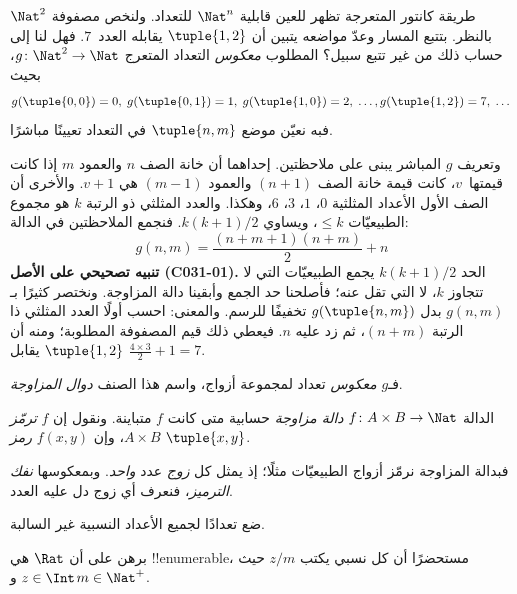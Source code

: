 \documentclass[../../../include/open-logic-section]{subfiles}
\begin{document}

\begin{explain}
طريقة كانتور المتعرجة تظهر للعين قابلية $\Nat^n$ للتعداد.
ولنخص مصفوفة $\Nat^2$ بالنظر. بتتبع المسار وعدّ مواضعه يتبين
أن $\tuple{1,2}$ يقابله العدد~$7$. فهل لنا إلى حساب ذلك من
غير تتبع سبيل؟ المطلوب \emph{معكوس} التعداد المتعرج
$g\colon \Nat^2 \to \Nat$، بحيث
\[
g(\tuple{0,0}) = 0, \;
g(\tuple{0,1}) = 1, \;
g(\tuple{1,0}) = 2, \; \dots,
g(\tuple{1,2}) = 7, \; \dots
\]
فبه نعيّن موضع $\tuple{n, m}$ في التعداد تعيينًا مباشرًا.

وتعريف $g$ المباشر يبنى على ملاحظتين. إحداهما أن خانة الصف $n$
والعمود $m$ إذا كانت قيمتها~$v$، كانت قيمة خانة الصف $(n+1)$
والعمود $(m-1)$ هي $v + 1$. والأخرى أن الصف الأول الأعداد
المثلثية $0$، $1$، $3$، $6$، وهكذا. والعدد المثلثي ذو الرتبة $k$
هو مجموع الطبيعيّات $\leq k$، ويساوي
$k(k+1)/2$. فنجمع الملاحظتين في الدالة:
\[
  g(n,m) = \frac{(n+m+1)(n+m)}{2} + n
\]
\textbf{تنبيه تصحيحي على الأصل (C031-01).} الحد $k(k+1)/2$ يجمع الطبيعيّات التي
لا تتجاوز $k$، لا التي تقل عنه؛ فأصلحنا حد الجمع وأبقينا دالة المزاوجة.
ونختصر كثيرًا بـ$g(n, m)$ بدل $g(\tuple{n, m})$ تخفيفًا للرسم.
والمعنى: احسب أولًا العدد المثلثي ذا الرتبة $(n+m)$،
ثم زد عليه $n$. فيعطي ذلك قيم المصفوفة المطلوبة؛ ومنه أن
$\tuple{1, 2}$ يقابل $\frac{4 \times 3}{2} +
1 = 7$.

فـ$g$ \emph{معكوس} تعداد لمجموعة أزواج، واسم هذا الصنف
\emph{دوال المزاوجة}.
\end{explain}

\begin{defn}
الدالة $f\colon A \times B \to \Nat$ \emph{دالة مزاوجة} حسابية
متى كانت $f$ متباينة. ونقول إن $f$ \emph{ترمّز} $A \times B$،
وإن $f(x,y)$ \emph{رمز} $\tuple{x,y}$.
\end{defn}

\begin{explain}
فبدالة المزاوجة نرمّز أزواج الطبيعيّات مثلًا؛ إذ يمثل كل
\emph{زوج} عدد \emph{واحد}. وبمعكوسها \emph{نفك الترميز}،
فنعرف أي زوج دل عليه العدد.
\end{explain}

\begin{prob}
ضع تعدادًا لجميع الأعداد النسبية غير السالبة.
\end{prob}

\begin{prob}
برهن على أن $\Rat$ هي !!{enumerable}، مستحضرًا أن كل نسبي
يكتب $z/m$ حيث $z \in \Int$ و$m \in \Nat^+$.
\end{prob}
\end{document}
